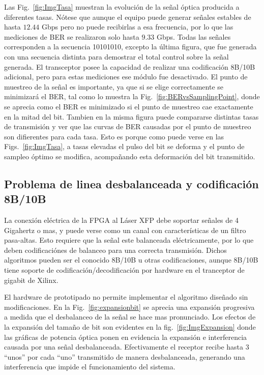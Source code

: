 Las Fig.~\ref{fig:ImgTasa} muestran la evolución de la señal óptica producida a diferentes
tasas. Nótese que aunque el equipo puede generar señales estables de
hasta $12.44$ Gbps pero no puede recibirlas a esa frecuencia, por lo que las
mediciones de BER se realizaron solo hasta $9.33$ Gbps. Todas las señales
corresponden a la secuencia 10101010, excepto la última figura,
que fue generada con una secuencia distinta para demostrar el total
control sobre la señal generada. El transceptor posee la capacidad de
realizar una codificación 8B/10B adicional, pero para estas mediciones
ese módulo fue desactivado.
El punto de muestreo de la señal es importante, ya que si se elige correctamente se minimizará el BER, tal como lo muestra la Fig.~\ref{fig:BERvsSamplingPoint}, donde se aprecia como el BER es minimizado si el punto de muestreo cae exactamente en la mitad del bit. Tambien en la misma figura puede compararse distintas tasas de transmisión y ver que las curvas de BER causadas por el punto de muestreo son difierentes para cada tasa. Esto es porque como puede verse en las Figs.~\ref{fig:ImgTasa}, a tasas elevadas el pulso del bit se deforma y el punto de sampleo óptimo se modifica, acompañando esta deformación del bit transmitido.


\subsection{Problema de linea desbalanceada y codificación 8B/10B}
La conexión eléctrica de la FPGA al Láser XFP debe soportar señales de 4 Gigahertz o mas, y puede verse como un canal con características de un filtro pasa-altas. Esto requiere que la señal este balanceada eléctricamente, por lo que deben codificaciónes de balanceo para una correcta transmisión. Dichos algoritmos pueden ser el conocido 8B/10B u otras codificaciones, aunque 8B/10B tiene soporte de codificación/decodificación por hardware en el tranceptor de gigabit de Xilinx.

El hardware de prototipado no permite implementar el algoritmo diseñado sin modificaciones. En la Fig.~\ref{fig:expansionbit} se aprecia una expansión progresiva a medida que el desbalanceo de la señal se hace mas pronunciado. Los efectos de la expansión del tamaño de bit son evidentes en la fig.~\ref{fig:ImgExpansion} donde las gráficas de potencia óptica ponen en evidencia la expansión e interferencia causada por una señal desbalanceada.
Efectivamente el receptor recibe hasta 3 ``unos'' por cada ``uno'' transmitido de manera desbalanceada, generando una interferencia que impide el funcionamiento del sistema.

